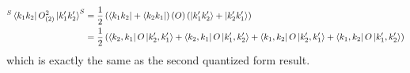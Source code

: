 \documentclass[10pt]{article}
\begin{document}
\begin{equation*}
  \begin{split}
    {}^{S}\bra{k_{1}k_{2}}O^{2}_{(2)}\ket{k_{1}'k_{2}'}^{S} & = \frac{1}{2}\left(\bra{k_{1}k_{2}} + \bra{k_{2}k_{1}}\right)\left(O\right)\left(\ket{k_{1}'k_{2}'} + \ket{k_{2}'k_{1}'}\right) \\
    & = \frac{1}{2}\left(\bra{k_{2},k_{1}}O\ket{k_{2}',k_{1}'} + \bra{k_{2},k_{1}}O\ket{k_{1}',k_{2}'} + \bra{k_{1},k_{2}}O\ket{k_{2}',k_{1}'} + \bra{k_{1},k_{2}}O\ket{k_{1}',k_{2}'}\right) \\
  \end{split}
\end{equation*}
which is exactly the same as the second quantized form result. 
\end{document}
